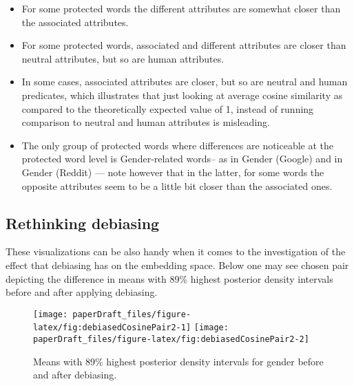 \documentclass[
  12pt,
  dvipsnames,enabledeprecatedfontcommands]{scrartcl}
\begin{document}
\begin{itemize}
\item
  For some protected words the different attributes are somewhat closer
  than the associated attributes.
\item
  For some protected words, associated and different attributes are
  closer than neutral attributes, but so are human attributes.
\item
  In some cases, associated attributes are closer, but so are neutral
  and human predicates, which illustrates that just looking at average
  cosine similarity as compared to the theoretically expected value of
  1, instead of running comparison to neutral and human attributes is
  misleading.
\item
  The only group of protected words where differences are noticeable at
  the protected word level is Gender-related words-- as in Gender
  (Google) and in Gender (Reddit) --- note however that in the latter,
  for some words the opposite attributes seem to be a little bit closer
  than the associated ones.
\end{itemize}

\hypertarget{rethinking-debiasing}{%
\subsection{Rethinking debiasing}\label{rethinking-debiasing}}

These visualizations can be also handy when it comes to the
investigation of the effect that debiasing has on the embedding space.
Below one may see chosen pair depicting the difference in means with
89\% highest posterior density intervals before and after applying
debiasing.

\begin{figure}[H]

\begin{center}\texttt{[image: paperDraft\_files/figure-latex/fig:debiasedCosinePair2-1]} \texttt{[image: paperDraft\_files/figure-latex/fig:debiasedCosinePair2-2]} \end{center}
\caption{Means with 89\% highest posterior density intervals for gender before and after debiasing.}
\label{fig:empiricalDebiasedPair}
\end{figure}
\end{document}
